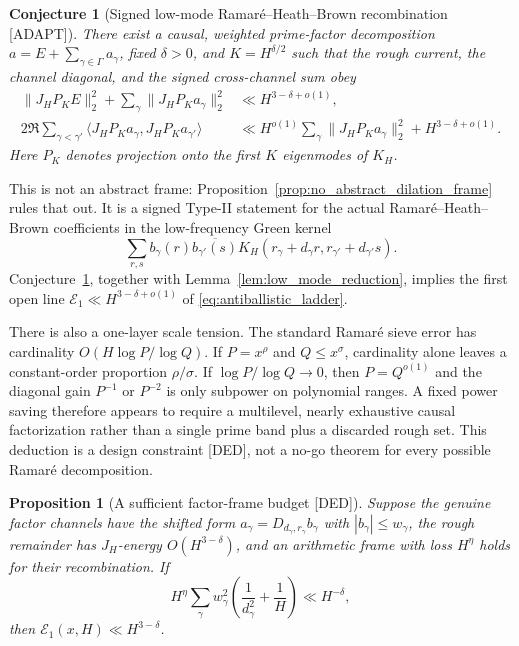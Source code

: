 \documentclass[11pt]{amsart}
\numberwithin{equation}{section}
\theoremstyle{plain}
\newtheorem{proposition}[theorem]{Proposition}
\newtheorem{conjecture}[theorem]{Conjecture}
\theoremstyle{definition}
\theoremstyle{remark}
\begin{document}
\begin{conjecture}[Signed low-mode Ramar\'e--Heath--Brown recombination
\textnormal{[ADAPT]}]
\label{conj:signed_low_mode_recombination}
There exist a causal, weighted prime-factor decomposition
$a=E+\sum_{\gamma\in\Gamma}a_\gamma$, fixed $\delta>0$, and
$K=H^{\delta/2}$ such that the rough current, the channel diagonal, and the
signed cross-channel sum obey
\begin{align}
 \|J_HP_KE\|_2^2
 +\sum_{\gamma}\|J_HP_Ka_\gamma\|_2^2
 &\ll H^{3-\delta+o(1)},\\
 2\Re\sum_{\gamma<\gamma'}
 \langle J_HP_Ka_\gamma,J_HP_Ka_{\gamma'}\rangle
 &\ll H^{o(1)}
 \sum_{\gamma}\|J_HP_Ka_\gamma\|_2^2+H^{3-\delta+o(1)}.
\label{eq:signed_low_mode_cross_channel}
\end{align}
Here $P_K$ denotes projection onto the first $K$ eigenmodes of $K_H$.
\end{conjecture}

This is not an abstract frame: Proposition~\ref{prop:no_abstract_dilation_frame}
rules that out.  It is a signed Type-II statement for the actual
Ramar\'e--Heath--Brown coefficients in the low-frequency Green kernel
\begin{equation}
 \sum_{r,s}b_\gamma(r)\overline{b_{\gamma'}(s)}
 K_H(r_\gamma+d_\gamma r,r_{\gamma'}+d_{\gamma'}s).
\label{eq:signed_type_ii_green_kernel}
\end{equation}
Conjecture~\ref{conj:signed_low_mode_recombination}, together with
Lemma~\ref{lem:low_mode_reduction}, implies the first open line
$\mathcal E_1\ll H^{3-\delta+o(1)}$ of
\eqref{eq:antiballistic_ladder}.

There is also a one-layer scale tension.  The standard Ramar\'e sieve error
has cardinality $O(H\log P/\log Q)$.  If $P=x^\rho$ and $Q\leq x^\sigma$,
cardinality alone leaves a constant-order proportion $\rho/\sigma$.  If
$\log P/\log Q\to0$, then $P=Q^{o(1)}$ and the diagonal gain $P^{-1}$ or
$P^{-2}$ is only subpower on polynomial ranges.  A fixed power saving
therefore appears to require a multilevel, nearly exhaustive causal
factorization rather than a single prime band plus a discarded rough set.
This deduction is a design constraint [DED], not a no-go theorem for every
possible Ramar\'e decomposition.

\begin{proposition}[A sufficient factor-frame budget \textnormal{[DED]}]
\label{prop:sufficient_factor_frame_budget}
Suppose the genuine factor channels have the shifted form
$a_\gamma=D_{d_\gamma,r_\gamma}b_\gamma$ with
$|b_\gamma|\leq w_\gamma$, the rough remainder has
$J_H$-energy $O(H^{3-\delta})$, and an arithmetic frame with loss $H^\eta$
holds for their recombination.  If
\begin{equation}
 H^\eta\sum_\gamma w_\gamma^2
 \left(\frac1{d_\gamma^2}+\frac1H\right)
 \ll H^{-\delta},
\label{eq:factor_frame_budget}
\end{equation}
then $\mathcal E_1(x,H)\ll H^{3-\delta}$.
\end{proposition}
\end{document}
